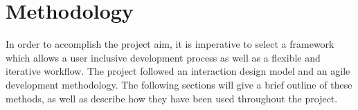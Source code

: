 \chapter{Methodology}
In order to accomplish the project aim, it is imperative to select a framework which allows a user inclusive development process as well as a flexible and iterative workflow. The project followed an interaction design model and an agile development methodology. The following sections will give a brief outline of these methods, as well as describe how they have been used throughout the project.



